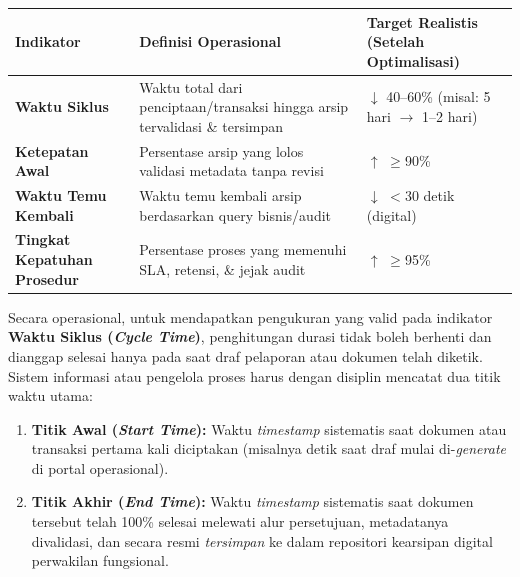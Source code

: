 \documentclass[12pt,a4paper]{report}
\begin{document}
\vspace{0.2cm}
\noindent
\small
\begin{tabularx}{\textwidth}{@{} >{\raggedright\arraybackslash}X >{\raggedright\arraybackslash}X >{\raggedright\arraybackslash}X @{}}
\toprule
\textbf{Indikator} & \textbf{Definisi Operasional} & \textbf{Target Realistis (Setelah Optimalisasi)} \\
\midrule
\textbf{Waktu Siklus} & Waktu total dari penciptaan/transaksi hingga arsip tervalidasi \& tersimpan & $\downarrow$ 40--60\% (misal: 5 hari $\rightarrow$ 1--2 hari) \\
\textbf{Ketepatan Awal} & Persentase arsip yang lolos validasi metadata tanpa revisi & $\uparrow$ $\geq$90\% \\
\textbf{Waktu Temu Kembali} & Waktu temu kembali arsip berdasarkan query bisnis/audit & $\downarrow$ $<$30 detik (digital) \\
\textbf{Tingkat Kepatuhan Prosedur} & Persentase proses yang memenuhi SLA, retensi, \& jejak audit & $\uparrow$ $\geq$95\% \\
\bottomrule
\end{tabularx}
\vspace{0.3cm}

Secara operasional, untuk mendapatkan pengukuran yang valid pada indikator \textbf{Waktu Siklus (\textit{Cycle Time})}, penghitungan durasi tidak boleh berhenti dan dianggap selesai hanya pada saat draf pelaporan atau dokumen telah diketik. Sistem informasi atau pengelola proses harus dengan disiplin mencatat dua titik waktu utama:
\begin{enumerate}[leftmargin=*]
    \item \textbf{Titik Awal (\textit{Start Time}):} Waktu \textit{timestamp} sistematis saat dokumen atau transaksi pertama kali diciptakan (misalnya detik saat draf mulai di-\textit{generate} di portal operasional).
    \item \textbf{Titik Akhir (\textit{End Time}):} Waktu \textit{timestamp} sistematis saat dokumen tersebut telah 100\% selesai melewati alur persetujuan, metadatanya divalidasi, dan secara resmi \textit{tersimpan} ke dalam repositori kearsipan digital perwakilan fungsional.
\end{enumerate}
\end{document}
